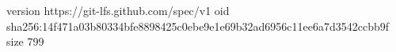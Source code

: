 version https://git-lfs.github.com/spec/v1
oid sha256:14f471a03b80334bfe8898425c0ebe9e1e69b32ad6956c11ee6a7d3542ccbb9f
size 799
